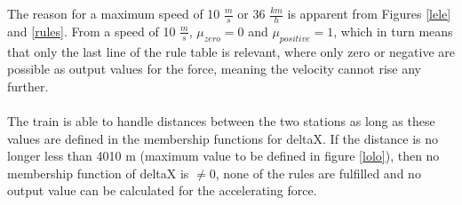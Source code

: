 The reason for a maximum speed of 10 $\frac{m}{s}$ or 36 $\frac{km}{h}$ is apparent from Figures \ref{lele} and \ref{rules}. From a speed of 10 $\frac{m}{s}$, $\mu_{zero} = 0$ and $\mu_{positive} = 1$, which in turn means that only the last line of the rule table is relevant, where only \glqq zero\grqq{} or \glqq negative\grqq{} are possible as output values for the force, meaning the velocity cannot rise any further.
\\
\\
The train is able to handle distances between the two stations as long as these values are defined in the membership functions for deltaX. If the distance is no longer less than 4010 m (maximum value to be defined in figure \ref{lolo}), then no membership function of deltaX is $\neq 0$, none of the rules are fulfilled and no output value can be calculated for the accelerating force.





